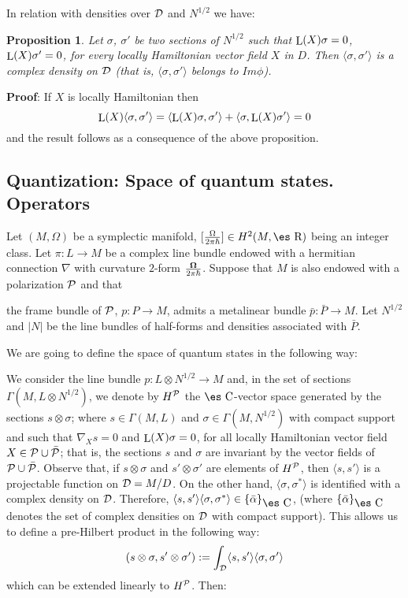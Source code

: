 \documentclass[12pt]{article}
\newtheorem{prop}{Proposition}
\def\beq{\begin{equation}}
\def\eeq{\end{equation}}
\def\qed{\ifvmode\removelastskip\fi
{\unskip\nobreak\hfil\penalty50\hbox{}\nobreak\hfil
\hbox{\vrule height1.2ex width1.2ex}\parfillskip=0pt
\finalhyphendemerits=0 \par\smallskip}}
\def\Real{\mbox{\es R}}
\def\Complex{\mbox{\es C}}
\def\Lie{\mathop{\rm L}\nolimits}
\begin{document}
In relation with densities over ${\cal D}$ and $N^{1/2}$ we have:

\begin{prop}
Let $\sigma$, $\sigma '$ be two sections of $N^{1/2}$
such that $\Lie(X)\sigma = 0$, $\Lie(X)\sigma ' = 0$,
for every locally Hamiltonian vector field $X$ in $D$.
Then $\langle \sigma ,\sigma ' \rangle$ is a complex density on ${\cal
D}$
(that is, $\langle \sigma ,\sigma ' \rangle$ belongs to $Im \phi$).
\end{prop}
{\bf Proof}: 
If $X$ is locally Hamiltonian then
$$
\Lie(X)\langle \sigma ,\sigma ' \rangle =
\langle \Lie(X)\sigma ,\sigma ' \rangle +
\langle \sigma ,\Lie(X)\sigma ' \rangle = 0
$$
and the result follows as a consequence of the above proposition.
\qed




\subsection{Quantization: Space of quantum states. Operators}


Let $(M,\Omega )$ be a symplectic manifold,
$[\frac{\Omega}{2\pi\hbar}] \in H^2(M,\Real )$ being an integer class.
Let $\pi \colon L \to M$ be a complex line bundle endowed with a
hermitian connection $\nabla$ with curvature $2$-form
$\frac{{\bf \Omega}}{2\pi\hbar}$.
Suppose that $M$ is also endowed with a polarization ${\cal P}$ and that

the
frame bundle of ${\cal P}$, $p \colon P \to M$,
admits a metalinear bundle $\bar p \colon \bar P \to M$.
Let $N^{1/2}$ and $|N|$ be the line bundles of half-forms and densities
associated with $\bar P$.

We are going to define the space of quantum states in the following way:

We consider the line bundle $p \colon L \otimes N^{1/2} \to M$
and, in the set of sections $\Gamma (M,L \otimes N^{1/2})$, we
denote by $H^{\cal P}$ the $\Complex$-vector space generated by
the sections $s \otimes \sigma$; where $s \in \Gamma (M,L)$ and
$\sigma \in \Gamma (M,N^{1/2})$ with compact support and such that
$\nabla_Xs = 0$ and $\Lie(X)\sigma = 0$, for all locally
Hamiltonian vector field $X \in {\cal P} \cup \bar {\cal P}$; that
is, the sections $s$ and $\sigma$ are invariant by the vector
fields of ${\cal P} \cup \bar {\cal P}$. Observe that, if $s
\otimes \sigma$ and $s' \otimes \sigma '$ are elements of $H^{\cal
P}$, then $\langle s,s' \rangle$ is a projectable function on
${\cal D} = M/D$. On the other hand, $\langle \sigma ,\sigma^*
\rangle$ is identified with a complex density on ${\cal D}$.
Therefore, $\langle s,s' \rangle \langle \sigma ,\sigma^* \rangle
\in \{ \bar \alpha \}_{\Complex}$, (where  $\{ \bar \alpha
\}_{\Complex}$ denotes the set of complex densities on ${\cal D}$
with compact support). This allows us to define a pre-Hilbert
product in the following way: \beq (s \otimes \sigma ,s' \otimes
\sigma ') := \int_{{\cal D}} \langle s,s' \rangle \langle \sigma
,\sigma ' \rangle \label{herprod} \eeq which can be extended
linearly to $H^{\cal P}$. Then:
\end{document}
